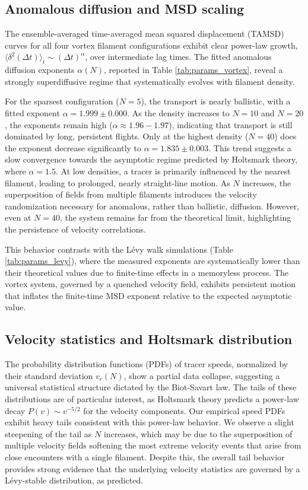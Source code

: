 \documentclass[]{article}
\begin{document}
\subsection{Anomalous diffusion and MSD scaling}

The ensemble-averaged time-averaged mean squared displacement (TAMSD) curves for all four vortex filament configurations exhibit clear power-law growth, $\langle \delta^2(\Delta t) \rangle_t \sim (\Delta t)^\alpha$, over intermediate lag times. The fitted anomalous diffusion exponents $\alpha(N)$, reported in Table \ref{tab:params_vortex}, reveal a strongly superdiffusive regime that systematically evolves with filament density.

For the sparsest configuration ($N=5$), the transport is nearly ballistic, with a fitted exponent $\alpha = 1.999 \pm 0.000$. As the density increases to $N=10$ and $N=20$, the exponents remain high ($\alpha \approx 1.96-1.97$), indicating that transport is still dominated by long, persistent flights. Only at the highest density ($N=40$) does the exponent decrease significantly to $\alpha = 1.835 \pm 0.003$. This trend suggests a slow convergence towards the asymptotic regime predicted by Holtsmark theory, where $\alpha = 1.5$. At low densities, a tracer is primarily influenced by the nearest filament, leading to prolonged, nearly straight-line motion. As $N$ increases, the superposition of fields from multiple filaments introduces the velocity randomization necessary for anomalous, rather than ballistic, diffusion. However, even at $N=40$, the system remains far from the theoretical limit, highlighting the persistence of velocity correlations.

This behavior contrasts with the L\'evy walk simulations (Table \ref{tab:params_levy}), where the measured exponents are systematically lower than their theoretical values due to finite-time effects in a memoryless process. The vortex system, governed by a quenched velocity field, exhibits persistent motion that inflates the finite-time MSD exponent relative to the expected asymptotic value.

\subsection{Velocity statistics and Holtsmark distribution}

The probability distribution functions (PDFs) of tracer speeds, normalized by their standard deviation $v_c(N)$, show a partial data collapse, suggesting a universal statistical structure dictated by the Biot-Savart law. The tails of these distributions are of particular interest, as Holtsmark theory predicts a power-law decay $P(v) \sim v^{-5/2}$ for the velocity components. Our empirical speed PDFs exhibit heavy tails consistent with this power-law behavior. We observe a slight steepening of the tail as $N$ increases, which may be due to the superposition of multiple velocity fields softening the most extreme velocity events that arise from close encounters with a single filament. Despite this, the overall tail behavior provides strong evidence that the underlying velocity statistics are governed by a L\'evy-stable distribution, as predicted.
\end{document}
